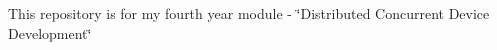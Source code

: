 This repository is for my fourth year module -\/ \char`\"{}\+Distributed Concurrent Device Development\char`\"{} 